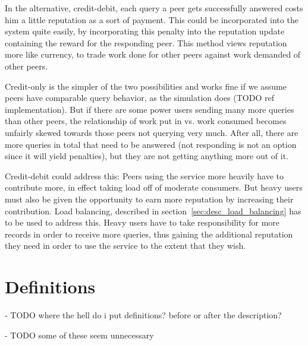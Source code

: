In the alternative, credit-debit, each query a peer gets successfully answered
costs him a little reputation as a sort of payment. This could be incorporated
into the system quite easily, by incorporating this penalty into the reputation
update containing the reward for the responding peer. This method views
reputation more like currency, to trade work done for other peers against work
demanded of other peers.

Credit-only is the simpler of the two possibilities and works fine if we assume
peers have comparable query behavior, as the simulation does (TODO ref
implementation). But if there are some power users sending many more queries
than other peers, the relationship of work put in vs. work consumed becomes
unfairly skewed towards those peers not querying very much. After all, there are
more queries in total that need to be answered (not responding is not an option
since it will yield penalties), but they are not getting anything more out of
it.

Credit-debit could address this: Peers using the service more heavily have to
contribute more, in effect taking load off of moderate consumers. But heavy
users must also be given the opportunity to earn more reputation by increasing
their contribution. Load balancing, described in
section~\ref{sec:desc_load_balancing} has to be used to address this. Heavy
users have to take responsibility for more records in order to receive more
queries, thus gaining the additional reputation they need in order to use the
service to the extent that they wish.

\section{Definitions}
- TODO where the hell do i put definitions? before or after the description?

- TODO some of these seem unnecessary


